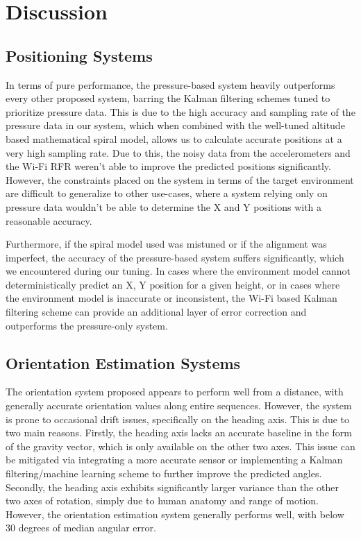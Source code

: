 \chapter{Discussion}

\section{Positioning Systems}
In terms of pure performance, the pressure-based system heavily outperforms every other proposed system, barring the Kalman filtering schemes tuned to prioritize pressure data. This is due to the high accuracy and sampling rate of the pressure data in our system, which when combined with the well-tuned altitude based mathematical spiral model, allows us to calculate accurate positions at a very high sampling rate. Due to this, the noisy data from the accelerometers and the Wi-Fi RFR weren't able to improve the predicted positions significantly. However, the constraints placed on the system in terms of the target environment are difficult to generalize to other use-cases, where a system relying only on pressure data wouldn't be able to determine the X and Y positions with a reasonable accuracy.
\par
Furthermore, if the spiral model used was mistuned or if the alignment was imperfect, the accuracy of the pressure-based system suffers significantly, which we encountered during our tuning. In cases where the environment model cannot deterministically predict an X, Y position for a given height, or in cases where the environment model is inaccurate or inconsistent, the Wi-Fi based Kalman filtering scheme can provide an additional layer of error correction and outperforms the pressure-only system.

\section{Orientation Estimation Systems}
The orientation system proposed appears to perform well from a distance, with generally accurate orientation values along entire sequences. However, the system is prone to occasional drift issues, specifically on the heading axis. This is due to two main reasons. Firstly, the heading axis lacks an accurate baseline in the form of the gravity vector, which is only available on the other two axes. This issue can be mitigated via integrating a more accurate sensor or implementing a Kalman filtering/machine learning scheme to further improve the predicted angles. Secondly, the heading axis exhibits significantly larger variance than the other two axes of rotation, simply due to human anatomy and range of motion. However, the orientation estimation system generally performs well, with below 30 degrees of median angular error.